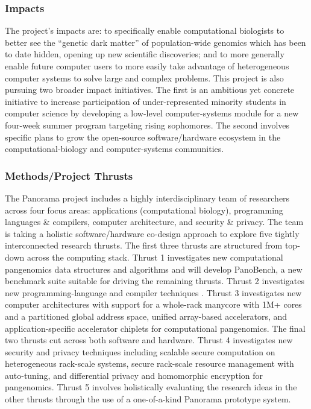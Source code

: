 \subsubsection{Impacts}
The project's impacts are: to specifically enable computational biologists to better see the ``genetic dark matter'' of population-wide genomics which has been to date hidden, opening up new scientific discoveries; and to more generally enable future computer users to more easily take advantage of heterogeneous computer systems to solve large and complex problems. 
This project is also pursuing two broader impact initiatives. 
The first is an ambitious yet concrete initiative to increase participation of under-represented minority students in computer science by developing a low-level computer-systems module for a new four-week summer program targeting rising sophomores. 
The second involves specific plans to grow the open-source software/hardware ecosystem in the computational-biology and computer-systems communities.

\subsubsection{Methods/Project Thrusts}
The Panorama project includes a highly interdisciplinary team of researchers across four focus areas: applications (computational biology), programming languages \& compilers, computer architecture, and security \& privacy. 
The team is taking a holistic software/hardware co-design approach to explore five tightly interconnected research thrusts. 
The first three thrusts are structured from top-down across the computing stack. 
Thrust 1 investigates new computational pangenomics data structures and algorithms and will develop PanoBench, a new benchmark suite suitable for driving the remaining thrusts. 
Thrust 2 investigates new programming-language and compiler techniques \cite{umar2022, xiang2022, hua2022mgx}. 
Thrust 3 investigates new computer architectures with support for a whole-rack manycore with 1M+ cores and a partitioned global address space, unified array-based accelerators, and application-specific accelerator chiplets for computational pangenomics. 
The final two thrusts cut across both software and hardware. 
Thrust 4 investigates new security and privacy techniques including scalable secure computation on heterogeneous rack-scale systems, secure rack-scale resource management with auto-tuning, and differential privacy and homomorphic encryption for pangenomics. 
Thrust 5 involves holistically evaluating the research ideas in the other thrusts through the use of a one-of-a-kind Panorama prototype system.


